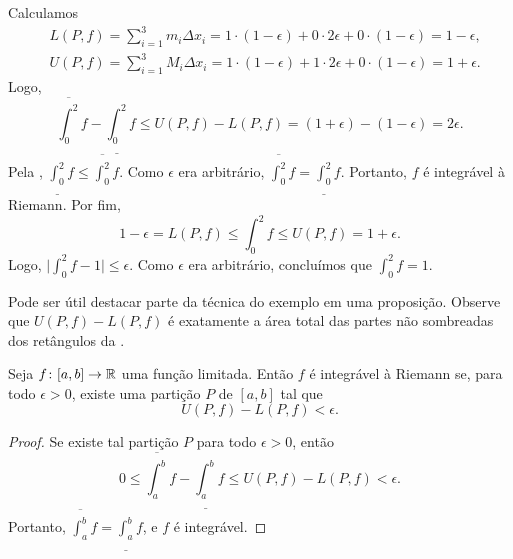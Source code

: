 \begin{example}
Calculamos
\begin{align*}
& L(P,f) = \sum_{i=1}^3 m_i \Delta x_i =
1 \cdot (1-\epsilon) + 0 \cdot 2\epsilon + 0 \cdot (1-\epsilon)
= 1-\epsilon , \\
& U(P,f) = \sum_{i=1}^3 M_i \Delta x_i =
1 \cdot (1-\epsilon) + 1 \cdot 2\epsilon + 0 \cdot (1-\epsilon)
= 1+\epsilon .
\end{align*}
Logo,
\begin{equation*}
\overline{\int_0^2} f - 
\underline{\int_0^2} f
\leq
U(P,f) - L(P,f)
=
(1+\epsilon)
- (1-\epsilon) = 2 \epsilon .
\end{equation*}
Pela , $\underline{\int_0^2} f \leq \overline{\int_0^2} f$.
Como $\epsilon$ era arbitrário,
$\overline{\int_0^2} f = \underline{\int_0^2} f$. Portanto, $f$ é integrável
à Riemann. Por fim,
\begin{equation*}
1-\epsilon = L(P,f) \leq \int_0^2 f \leq U(P,f) =
1+\epsilon.
\end{equation*}
Logo, $\bigl\lvert \int_0^2 f - 1 \bigr\rvert \leq \epsilon$. Como
$\epsilon$ era arbitrário, concluímos que $\int_0^2 f = 1$.
\end{example}

Pode ser útil destacar parte da técnica do exemplo em uma proposição.
Observe que $U(P,f)-L(P,f)$ é exatamente a área total das partes não
sombreadas dos retângulos da .

\begin{prop}
Seja $f \colon [a,b] \to {\mathbb{R}}$ uma função limitada. Então $f$ é integrável à
Riemann se, para todo $\epsilon > 0$, existe uma partição $P$ de
$[a,b]$ tal que
\begin{equation*}
U(P,f) - L(P,f) < \epsilon .
\end{equation*}
\end{prop}

\begin{proof}
Se existe tal partição $P$ para todo $\epsilon > 0$, então
\begin{equation*}
0 \leq
\overline{\int_a^b} f - 
\underline{\int_a^b} f
\leq
U(P,f) - L(P,f) < \epsilon .
\end{equation*}
Portanto,
$\overline{\int_a^b} f = \underline{\int_a^b} f$, e $f$ é integrável.
\end{proof}

